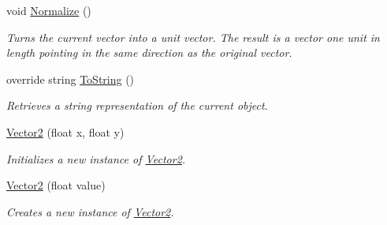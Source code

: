 \begin{DoxyCompactItemize}
void \hyperlink{structMicrosoft_1_1Xna_1_1Framework_1_1Vector2_af279e0f0ff720ee54d6733674dfda50a}{Normalize} ()
\begin{DoxyCompactList}\small\item\em Turns the current vector into a unit vector. The result is a vector one unit in length pointing in the same direction as the original vector.\end{DoxyCompactList}\item 
override string \hyperlink{structMicrosoft_1_1Xna_1_1Framework_1_1Vector2_aa73e7c4dd1df5fd5fbf81c7764ee1533}{To\+String} ()
\begin{DoxyCompactList}\small\item\em Retrieves a string representation of the current object.\end{DoxyCompactList}\item 
\hyperlink{structMicrosoft_1_1Xna_1_1Framework_1_1Vector2_ae17a63b0c563f7997b976432c326b55b}{Vector2} (float x, float y)
\begin{DoxyCompactList}\small\item\em Initializes a new instance of \hyperlink{structMicrosoft_1_1Xna_1_1Framework_1_1Vector2}{Vector2}.\end{DoxyCompactList}\item 
\hyperlink{structMicrosoft_1_1Xna_1_1Framework_1_1Vector2_a40def9b2cbf6a459c0ab6be92c42d886}{Vector2} (float value)
\begin{DoxyCompactList}\small\item\em Creates a new instance of \hyperlink{structMicrosoft_1_1Xna_1_1Framework_1_1Vector2}{Vector2}.\end{DoxyCompactList}\end{DoxyCompactItemize}
